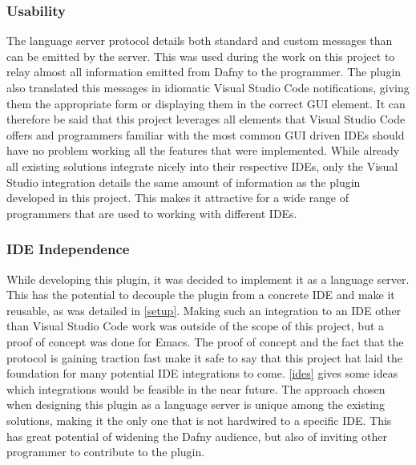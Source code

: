 \subsubsection{Usability}
The language server protocol details both standard and custom messages than can be emitted by the server. This was used during the work on this project to relay almost all information emitted from Dafny to the programmer. The plugin also translated this messages in idiomatic Visual Studio Code notifications, giving them the appropriate form or displaying them in the correct GUI element. It can therefore be said that this project leverages all elements that Visual Studio Code offers and programmers familiar with the most common GUI driven IDEs should have no problem working all the features that were implemented. \newline
While already all existing solutions integrate nicely into their respective IDEs, only the Visual Studio integration details the same amount of information as the plugin developed in this project. This makes it attractive for a wide range of programmers that are used to working with different IDEs. 

\subsubsection{IDE Independence}
While developing this plugin, it was decided to implement it as a language server. This has the potential to decouple the plugin from a concrete IDE and make it reusable, as was detailed in \ref{setup}. Making such an integration to an IDE other than Visual Studio Code work was outside of the scope of this project, but a proof of concept was done for Emacs. \newline
The proof of concept and the fact that the protocol is gaining traction fast make it safe to say that this project hat laid the foundation for many potential IDE integrations to come. \ref{ides} gives some ideas which integrations would be feasible in the near future. \newline
The approach chosen when designing this plugin as a language server is unique among the existing solutions, making it the only one that is not hardwired to a specific IDE. This has great potential of widening the Dafny audience, but also of inviting other programmer to contribute to the plugin.

